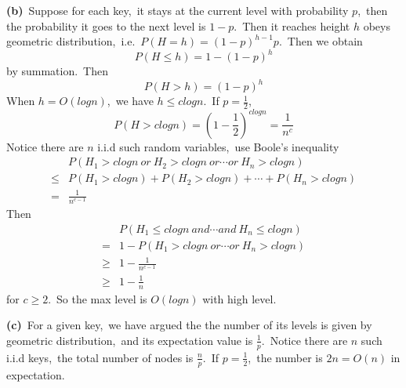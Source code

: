 \documentclass[]{article}
\begin{document}
	\textbf{(b)}\ Suppose for each key,\ it stays at the current level with probability $p$,\ then the probability it goes to the next level is $1 - p$.\ Then it reaches height $h$ obeys geometric distribution,\ i.e.\ $P(H = h) = (1-p)^{h-1}p$.\ Then we obtain
	\begin{equation*}
	P(H \leq h) = 1 - (1-p)^h
	\end{equation*}
	by summation.\ Then
	\begin{equation*}
		P(H > h) = (1 - p)^h
	\end{equation*}	
	When $h = O(logn)$,\ we have $h \leq clogn$.\ If $p = \frac{1}{2}$,
	\begin{equation*}
	P(H > clogn) = (1 - \frac{1}{2})^{clogn} = \frac{1}{n^c}
	\end{equation*}
	Notice there are $n$ i.i.d such random variables,\ use Boole's inequality
	\begin{equation*}
	\begin{aligned}
	&P(H_1 > clogn\ or\ H_2 > clogn\ or \cdots or\ H_n > clogn)\\ \leq &P(H_1 > clogn) + P(H_2 > clogn) + \cdots +P(H_n > clogn)\\ = &\frac{1}{n^{c-1}}
	\end{aligned}
	\end{equation*} 
	Then 
	\begin{equation*}
		\begin{aligned}
		&P(H_1 \leq clogn\ and \cdots and\ H_n \leq clogn)\\ = &1 - P(H_1 > clogn\ or\cdots or\ H_n > clogn)\\ \geq &1 - \frac{1}{n^{c-1}} \\ \geq & 1-\frac{1}{n}
		\end{aligned}
	\end{equation*}
	for $c \geq 2$.\ So the max level is $O(logn)$ with high level.
	
	\textbf{(c)}\ For a given key,\ we have argued the the number of its levels is given by geometric distribution,\ and its expectation value is $\frac{1}{p}$.\ Notice there are $n$ such i.i.d keys,\ the total number of nodes is $\frac{n}{p}$.\ If $p = \frac{1}{2}$,\ the number is $2n = O(n)$ in expectation.
\end{document}
